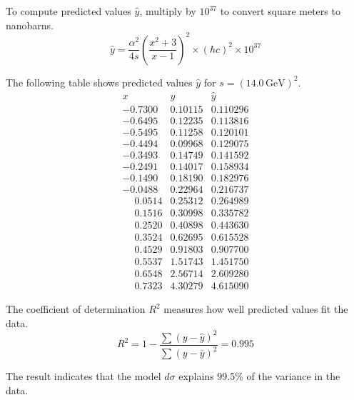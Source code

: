 To compute predicted values $\hat y$, multiply by $10^{37}$ to convert square meters to nanobarns.
\begin{equation*}
\hat y
=\frac{\alpha^2}{4s}
\left(\frac{x^2+3}{x-1}\right)^2
\times(\hbar c)^2
\times10^{37}
\end{equation*}

The following table shows predicted values $\hat y$ for $s=(14.0\,\text{GeV})^2$.
\begin{equation*}
\begin{matrix}
x & y & \hat y\\
-0.7300 & 0.10115 & 0.110296\\
-0.6495 & 0.12235 & 0.113816\\
-0.5495 & 0.11258 & 0.120101\\
-0.4494 & 0.09968 & 0.129075\\
-0.3493 & 0.14749 & 0.141592\\
-0.2491 & 0.14017 & 0.158934\\
-0.1490 & 0.18190 & 0.182976\\
-0.0488 & 0.22964 & 0.216737\\
\phantom{+}0.0514 & 0.25312 & 0.264989\\
\phantom{+}0.1516 & 0.30998 & 0.335782\\
\phantom{+}0.2520 & 0.40898 & 0.443630\\
\phantom{+}0.3524 & 0.62695 & 0.615528\\
\phantom{+}0.4529 & 0.91803 & 0.907700\\
\phantom{+}0.5537 & 1.51743 & 1.451750\\
\phantom{+}0.6548 & 2.56714 & 2.609280\\
\phantom{+}0.7323 & 4.30279 & 4.615090
\end{matrix}
\end{equation*}

The coefficient of determination $R^2$ measures how well predicted values fit the data.
\begin{equation*}
R^2=1-\frac{\sum(y-\hat y)^2}{\sum(y-\bar y)^2}=0.995
\end{equation*}

The result indicates that the model $d\sigma$ explains 99.5\% of the variance in the data.


